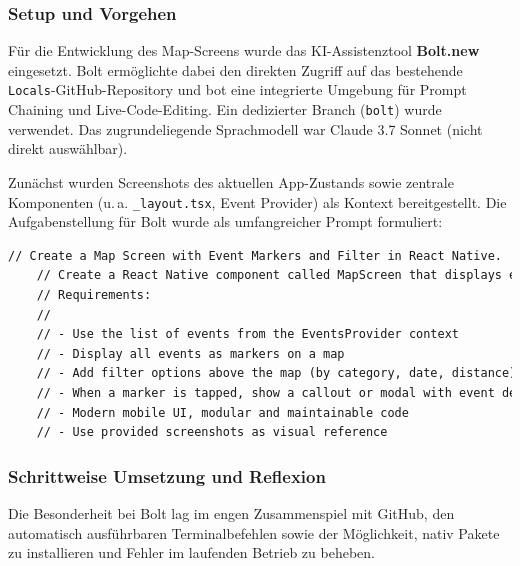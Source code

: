 \subsubsection{Setup und Vorgehen}
Für die Entwicklung des Map-Screens wurde das KI-Assistenztool
\textbf{Bolt.new} eingesetzt. Bolt ermöglichte dabei den direkten Zugriff auf
das bestehende \texttt{Locals}-GitHub-Repository und bot eine integrierte
Umgebung für Prompt Chaining und Live-Code-Editing. Ein dedizierter Branch
(\texttt{bolt}) wurde verwendet. Das zugrundeliegende Sprachmodell war Claude
3.7 Sonnet (nicht direkt auswählbar).

Zunächst wurden Screenshots des aktuellen App-Zustands sowie zentrale
Komponenten (u.\,a. \texttt{\_layout.tsx}, Event Provider) als Kontext
bereitgestellt. Die Aufgabenstellung für Bolt wurde als umfangreicher Prompt
formuliert:

\begin{lstlisting}[language=HTML]
    // Create a Map Screen with Event Markers and Filter in React Native.
    // Create a React Native component called MapScreen that displays event markers on a map using event data from the EventsProvider context.
    // Requirements:
    //
    // - Use the list of events from the EventsProvider context
    // - Display all events as markers on a map
    // - Add filter options above the map (by category, date, distance)
    // - When a marker is tapped, show a callout or modal with event details
    // - Modern mobile UI, modular and maintainable code
    // - Use provided screenshots as visual reference
\end{lstlisting}

\subsubsection{Schrittweise Umsetzung und Reflexion}
Die Besonderheit bei Bolt lag im engen Zusammenspiel mit GitHub, den
automatisch ausführbaren Terminalbefehlen sowie der Möglichkeit, nativ Pakete
zu installieren und Fehler im laufenden Betrieb zu beheben.

